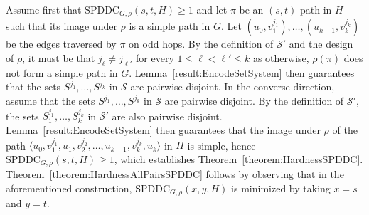 \LongVersion \documentclass[11pt]{article}
\theoremstyle{definition}
\theoremstyle{plain}
\newcommand{\SPDDC}[0]{\mathrm{SPDDC}}
\newcommand{\CalS}[0]{\mathcal{S}}
\begin{document}
Assume first that $\SPDDC_{G, \rho}(s, t, H) \geq 1$ and let $\pi$ be an $(s,
t)$-path in $H$ such that its image under $\rho$ is a simple path in $G$.
Let $(u_0, v_{1}^{j_1}), \dots, (u_{k - 1}, v_{k}^{j_k})$ be the edges
traversed by $\pi$ on odd hops.
By the definition of $\CalS'$ and the design of $\rho$, it must be that
$j_{\ell} \neq j_{\ell'}$ for every $1 \leq \ell < \ell' \leq k$ as otherwise,
$\rho(\pi)$ does not form a simple path in $G$.
Lemma~\ref{result:EncodeSetSystem} then guarantees that the sets $S^{j_1},
\dots, S^{j_k}$ in $\CalS$ are pairwise disjoint.
In the converse direction, assume that the sets $S^{j_1}, \dots, S^{j_k}$ in
$\CalS$ are pairwise disjoint.
By the definition of $\CalS'$, the sets $S_{1}^{j_1}, \dots, S_{k}^{j_k}$ in
$\CalS'$ are also pairwise disjoint.
Lemma~\ref{result:EncodeSetSystem} then guarantees that the image under
$\rho$ of the path $\langle u_0, v_{1}^{j_1}, u_1, v_{2}^{j_2}, \dots, u_{k - 1},
v_{k}^{j_k}, u_k \rangle$ in $H$ is simple, hence $\SPDDC_{G, \rho}(s, t, H)
\geq 1$, which establishes Theorem~\ref{theorem:HardnessSPDDC}.
Theorem~\ref{theorem:HardnessAllPairsSPDDC} follows by observing that in the
aforementioned construction, $\SPDDC_{G, \rho}(x, y, H)$ is minimized by
taking $x = s$ and $y = t$.
\end{document}
